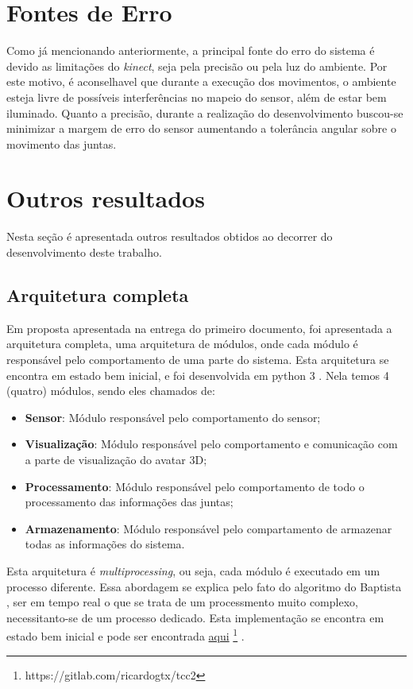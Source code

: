\section{Fontes de Erro}\label{sol:fontesErro}
  Como já mencionando anteriormente, a principal fonte do erro do sistema é devido as limitações do \textit{kinect}, seja pela precisão ou pela luz do ambiente.
Por este motivo, é aconselhavel que durante a execução dos movimentos, o ambiente esteja livre de possíveis interferências no mapeio do  sensor, além de estar bem iluminado. Quanto a precisão,
durante a realização do desenvolvimento buscou-se minimizar a margem de erro do sensor aumentando a tolerância angular sobre o movimento das juntas.

\section{Outros resultados}\label{sol:outrosResultados}
  Nesta seção é apresentada outros resultados obtidos ao decorrer do desenvolvimento deste trabalho.

\subsection{Arquitetura completa}\label{sol:arquiCompleta}
Em proposta apresentada na entrega do primeiro documento, foi apresentada a arquitetura completa, uma arquitetura de módulos, onde cada módulo é responsável
pelo comportamento de uma parte do sistema. Esta arquitetura se encontra em estado bem inicial, e foi desenvolvida
em python 3 \cite{pythondoc}. Nela temos 4 (quatro) módulos, sendo eles chamados de:

\begin{itemize}
  \item \textbf{Sensor}: Módulo responsável pelo comportamento do sensor;
  \item \textbf{Visualização}: Módulo responsável pelo comportamento e comunicação com a parte de visualização do avatar 3D;
  \item \textbf{Processamento}: Módulo responsável pelo comportamento de todo o processamento das informações das juntas;
  \item \textbf{Armazenamento}: Módulo responsável pelo compartamento de armazenar todas as informações do sistema.
\end{itemize}


Esta arquitetura é \textit{multiprocessing}, ou seja, cada módulo é executado em um processo diferente. Essa abordagem se explica pelo fato do algoritmo do
Baptista \cite{roberto}, ser em tempo real o que se trata de um processmento muito complexo, necessitanto-se de um processo dedicado. Esta implementação se encontra em estado bem inicial e pode ser encontrada \href{https://gitlab.com/ricardogtx/tcc2}{aqui} \footnote{https://gitlab.com/ricardogtx/tcc2} .

